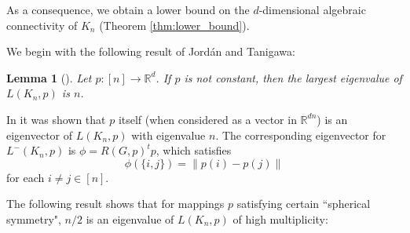 \documentclass[a4paper,11pt]{article}
\theoremstyle{plain}
\newtheorem{lemma}[theorem]{\bf Lemma}
\theoremstyle{definition}
\newcommand{\Rea}{{\mathbb R}}
\begin{document}
As a consequence, we obtain a lower bound on the $d$-dimensional algebraic connectivity of $K_n$ (Theorem \ref{thm:lower_bound}).

We begin with the following result of Jord\'an and Tanigawa:

\begin{lemma}[{\cite[Lemma 4.3]{jordan2020rigidity}}]\label{lemma:n_eigenvalue}
Let $p:[n]\to \Rea^d$. If $p$ is not constant, then the largest eigenvalue of $L(K_n,p)$ is $n$.
\end{lemma}
In \cite{jordan2020rigidity} it was shown that $p$ itself (when considered as a vector in $\Rea^{d n}$) is an eigenvector of $L(K_n,p)$ with eigenvalue $n$. The corresponding eigenvector for $L^{-}(K_n,p)$ is $\phi=R(G,p)^{t} p$, which satisfies
\[
    \phi(\{i,j\})= \|p(i)-p(j)\|
\]
for each $i\neq j\in[n]$.

The following result shows that for mappings $p$ satisfying certain ``spherical symmetry", $n/2$ is an eigenvalue of $L(K_n,p)$ of high multiplicity:
\end{document}
